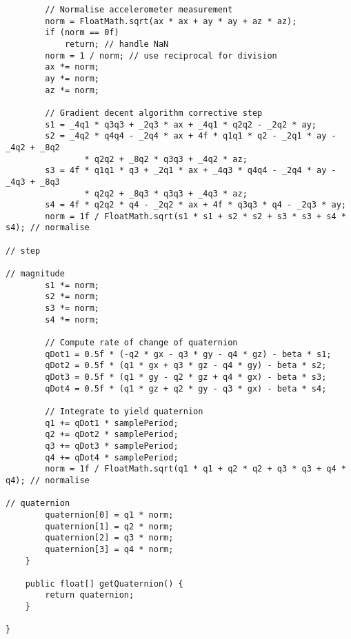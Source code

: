 \begin{lstlisting}
		// Normalise accelerometer measurement
		norm = FloatMath.sqrt(ax * ax + ay * ay + az * az);
		if (norm == 0f)
			return; // handle NaN
		norm = 1 / norm; // use reciprocal for division
		ax *= norm;
		ay *= norm;
		az *= norm;

		// Gradient decent algorithm corrective step
		s1 = _4q1 * q3q3 + _2q3 * ax + _4q1 * q2q2 - _2q2 * ay;
		s2 = _4q2 * q4q4 - _2q4 * ax + 4f * q1q1 * q2 - _2q1 * ay - _4q2 + _8q2
				* q2q2 + _8q2 * q3q3 + _4q2 * az;
		s3 = 4f * q1q1 * q3 + _2q1 * ax + _4q3 * q4q4 - _2q4 * ay - _4q3 + _8q3
				* q2q2 + _8q3 * q3q3 + _4q3 * az;
		s4 = 4f * q2q2 * q4 - _2q2 * ax + 4f * q3q3 * q4 - _2q3 * ay;
		norm = 1f / FloatMath.sqrt(s1 * s1 + s2 * s2 + s3 * s3 + s4 * s4); // normalise
																			// step
																			// magnitude
		s1 *= norm;
		s2 *= norm;
		s3 *= norm;
		s4 *= norm;

		// Compute rate of change of quaternion
		qDot1 = 0.5f * (-q2 * gx - q3 * gy - q4 * gz) - beta * s1;
		qDot2 = 0.5f * (q1 * gx + q3 * gz - q4 * gy) - beta * s2;
		qDot3 = 0.5f * (q1 * gy - q2 * gz + q4 * gx) - beta * s3;
		qDot4 = 0.5f * (q1 * gz + q2 * gy - q3 * gx) - beta * s4;

		// Integrate to yield quaternion
		q1 += qDot1 * samplePeriod;
		q2 += qDot2 * samplePeriod;
		q3 += qDot3 * samplePeriod;
		q4 += qDot4 * samplePeriod;
		norm = 1f / FloatMath.sqrt(q1 * q1 + q2 * q2 + q3 * q3 + q4 * q4); // normalise
																			// quaternion
		quaternion[0] = q1 * norm;
		quaternion[1] = q2 * norm;
		quaternion[2] = q3 * norm;
		quaternion[3] = q4 * norm;
	}

	public float[] getQuaternion() {
		return quaternion;
	}

}
\end{lstlisting}
